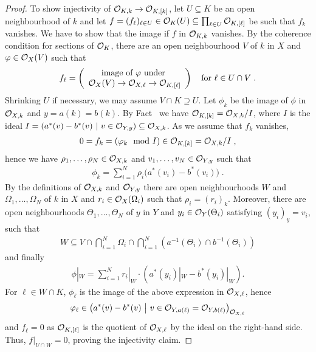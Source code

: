 \documentclass[a4paper,parskip=half,numbers=enddot, DIV=12]{scrreprt}
\begin{document}
\begin{proof}
    To show injectivity of $\Oo_{K,k}\morphism\Oo_{K,[k]}$, let $U\subseteq K$ be an open neighbourhood of $k$ and let $f= (f_\ell)_{\ell\in U} \in \mathcal{O}_K(U) \subseteq \prod_{\ell\in U} \mathcal{O}_{K,[\ell]}$ be such that $f_k$ vanishes. We have to show that the image if $f$ in $\mathcal{O}_{K,k}$ vanishes. By the coherence condition for sections of $\mathcal{O}_K$, there are an open neighbourhood $V$ of $k$ in $X$ and $\varphi\in \mathcal{O}_X(V)$ such that 
    \begin{align*}
    	f_\ell=\left(
    	\begin{array}{c}
	    	\text{image of }\phi\text{ under }\\
	    	\Oo_X(V) \morphism\Oo_{X,\ell} \morphism\Oo_{K,[\ell]} 
    	\end{array}\right)\quad\text{for }\ell\in U\cap V\;.
    \end{align*}
    Shrinking $U$ if necessary, we may assume $V\cap K \supseteq U$. Let $\phi_k$ be the image of $\phi$ in $\mathcal{O}_{X,k}$ and  $y=a(k)=b(k)$. By  Fact~ we have $\mathcal{O}_{K,[k]}=\mathcal{O}_{X,k}/I$, where $I$ is the ideal $I=\left(a^*(v)-b^*(v)\ \middle|\  v\in \mathcal{O}_{Y,y}\right)\subseteq\mathcal{O}_{X,k}$. As we assume that $f_k$ vanishes,
    \begin{align*}
    	0 = f_k=(\varphi_k\mod I)\in\mathcal{O}_{K,[k]}=\mathcal{O}_{X,k}/I\;, 
    \end{align*}
    hence we have $\rho_1,\ldots,\rho_N\in \mathcal{O}_{X,k}$ and $v_1,\ldots,v_N\in \mathcal{O}_{Y,y}$ such that
    \begin{align*}
        \phi_k = \sum_{i=1}^N \rho_i\big(a^*(v_i) -b^*(v_i)\big)\;.
    \end{align*}
    By the definitions of $\mathcal{O}_{X,k}$ and $\mathcal{O}_{Y,y}$ there are open neighbourhoods $W$ and $\Omega_1,\ldots,\Omega_N$ of $k$ in $X$ and $r_i \in \mathcal{O}_X(\Omega_i)$ such that $\rho_i = (r_i)_k$. Moreover, there are open neighbourhoods $\Theta_1,\ldots,\Theta_N$ of $y$ in $Y$ and $y_i \in \mathcal{O}_Y(\Theta_i)$ satisfying $(y_i)_y = v_i$, such that 
    \begin{align*}
        W\subseteq V\cap \bigcap_{i=1}^N \Omega_i \cap\bigcap_{i=1}^N \left(a^{-1}(\Theta_i) \cap b^{-1}(\Theta_i)\right)
    \end{align*}
    and finally
    \begin{align*}
        \phi|_W = \sum_{i=1}^N r_i|_W \cdot \left(a^*(y_i)|_W -b^*(y_i)|_W\right).
    \end{align*}
    For $\ell\in W\cap K$, $\phi_\ell$ is the image of the above expression in $\mathcal{O}_{X,\ell}$, hence 
    \begin{align*}
        \varphi_\ell\in \left(a^*(v) -b^*(v)\ \middle|\  v\in \mathcal{O}_{Y,a(\ell)} = \mathcal{O}_{Y,b(\ell)}\right)_{\mathcal{O}_{X,\ell}}
    \end{align*}
    and $f_\ell =0$ as $\mathcal{O}_{K,[\ell]}$ is the quotient of $\mathcal{O}_{X,\ell}$ by the ideal on the right-hand side. Thus, $f|_{U\cap W} =0$, proving the injectivity claim.
	

\end{proof}
\end{document}
